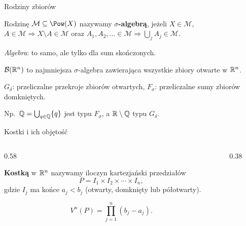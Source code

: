 \documentclass[aspectratio=169,11pt,t,envcountsect,professionalfonts]{beamer}
\begin{document}
\begin{frame}{Rodziny zbiorów}
  \begin{mydef}
    Rodzinę $\mathcal{M} \subseteq \Pow(X)$ nazywamy \textbf{$\sigma$-algebrą}, jeżeli
    $X \in \mathcal{M}$, $A \in \mathcal{M} \Rightarrow X \setminus A \in \mathcal{M}$ oraz
    $A_1, A_2, \ldots \in \mathcal{M} \Rightarrow \bigcup_{j} A_j \in \mathcal{M}$.
  \end{mydef}
  \textit{Algebra}: to samo, ale tylko dla sum skończonych.

  \begin{mydef}
    $\mathcal{B}({\mathbb{R}^{n}})$ to najmniejsza $\sigma$-algebra zawierająca wszystkie zbiory otwarte w $\mathbb{R}^{n}$.
  \end{mydef}

  \begin{mydef}
    $G_\delta$: przeliczalne przekroje zbiorów otwartych, \quad
    $F_\sigma$: przeliczalne sumy zbiorów domkniętych.
  \end{mydef}
  Np.\ $\mathbb{Q} = \bigcup_{q \in \mathbb{Q}}\{q\}$ jest typu $F_\sigma$, a $\mathbb{R} \setminus \mathbb{Q}$ typu $G_\delta$.
\end{frame}

\begin{frame}{Kostki i ich objętość}
  \begin{columns}[T]
    \begin{column}{0.58\textwidth}
      \begin{mydef}[Kostka]
        \textbf{Kostką} w $\mathbb{R}^{n}$ nazywamy iloczyn kartezjański przedziałów
        \[
          P = I_1 \times I_2 \times \cdots \times I_n,
        \]
        gdzie $I_j$ ma końce $a_j < b_j$ (otwarty, domknięty lub półotwarty).
      \end{mydef}
      \begin{mydef}
        \[
          V^n(P) = \prod_{j=1}^{n} (b_j - a_j).
        \]
      \end{mydef}
    \end{column}
    \begin{column}{0.38\textwidth}
      \begin{center}
      \end{center}
    \end{column}
  \end{columns}
\end{frame}
\end{document}

